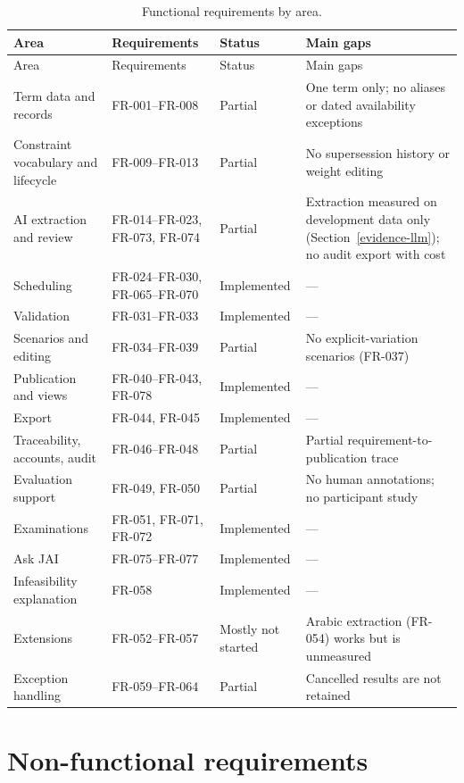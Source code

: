 \begin{longtable}{@{}p{}p{}p{}p{}@{}}
\caption{Functional requirements by area.}\label{tab:fr-areas}\\
\toprule
Area & Requirements & Status & Main gaps \\
\midrule
\endfirsthead
\toprule
Area & Requirements & Status & Main gaps \\
\midrule
\endhead
Term data and records & FR-001--FR-008 & Partial & One term only; no aliases or dated availability exceptions \\
Constraint vocabulary and lifecycle & FR-009--FR-013 & Partial & No supersession history or weight editing \\
AI extraction and review & FR-014--FR-023, FR-073, FR-074 & Partial & Extraction measured on development data only (Section~\ref{evidence-llm}); no audit export with cost \\
Scheduling & FR-024--FR-030, FR-065--FR-070 & Implemented & --- \\
Validation & FR-031--FR-033 & Implemented & --- \\
Scenarios and editing & FR-034--FR-039 & Partial & No explicit-variation scenarios (FR-037) \\
Publication and views & FR-040--FR-043, FR-078 & Implemented & --- \\
Export & FR-044, FR-045 & Implemented & --- \\
Traceability, accounts, audit & FR-046--FR-048 & Partial & Partial requirement-to-publication trace \\
Evaluation support & FR-049, FR-050 & Partial & No human annotations; no participant study \\
Examinations & FR-051, FR-071, FR-072 & Implemented & --- \\
Ask JAI & FR-075--FR-077 & Implemented & --- \\
Infeasibility explanation & FR-058 & Implemented & --- \\
Extensions & FR-052--FR-057 & Mostly not started & Arabic extraction (FR-054) works but is unmeasured \\
Exception handling & FR-059--FR-064 & Partial & Cancelled results are not retained \\
\bottomrule
\end{longtable}

\section{Non-functional requirements}


